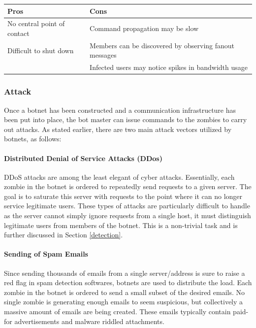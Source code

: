 \begin{tabular}{p{8cm} | p{8cm}}
  \textbf{Pros} & \textbf{Cons} \\ \hline
  \textbullet{}No central point of contact  & \textbullet{}Command propagation may be slow \\
  \textbullet{}Difficult to shut down       & \textbullet{}Members can be discovered by observing fanout messages\\
                                            & \textbullet{}Infected users may notice spikes in bandwidth usage\\
\end{tabular}

\subsubsection{Attack}
Once a botnet has been constructed and a communication infrastructure has been put into
place, the bot master can issue commands to the zombies to carry out attacks.
As stated earlier, there are two main attack vectors utilized by botnets, as follows:

\paragraph{Distributed Denial of Service Attacks (DDos)}
DDoS attacks are among the least elegant of cyber attacks. Essentially, each
zombie in the botnet is ordered to repeatedly send requests to a given server.
The goal is to saturate this server with requests to the point where it
can no longer service legitimate users.  These types of attacks are particularly
difficult to handle as the server cannot simply ignore requests from a single host,
it must distinguish legitimate users from members of the botnet.
This is a non-trivial task and is further discussed in Section \ref{detection}.

\paragraph{Sending of Spam Emails}
Since sending thousands of emails from a single server/address is sure to raise a red flag
in spam detection softwares, botnets are used to distribute the load.  Each zombie
in the botnet is ordered to send a small subset of the desired emails. No single zombie
is generating enough emails to seem suspicious, but collectively a massive amount
of emails are being created. These emails typically contain paid-for advertisements
and malware riddled attachments.

